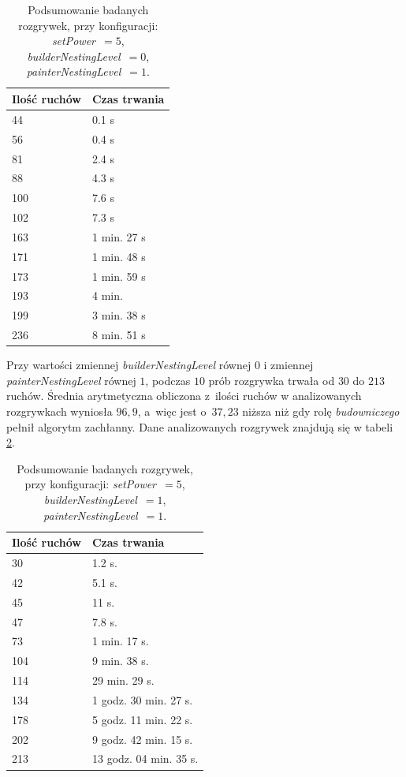 \documentclass[document]{xmgr}
\begin{document}
\begin{table}[tbh]
    \centering
    	\caption{Podsumowanie badanych rozgrywek, przy konfiguracji: \emph{setPower}~$=5$, \emph{builderNestingLevel}~$=0$, \emph{painterNestingLevel}~$=1$.}
	\begin{tabular}{|p{}|p{}|} \hline
	Ilość ruchów & Czas trwania \\ \hline
	44 & 0.1 s\\ \hline
	56 & 0.4 s\\ \hline
	81 & 2.4 s\\ \hline
	88 & 4.3 s\\ \hline
	100 & 7.6 s\\ \hline
	102 & 7.3 s\\ \hline
	163 & 1 min. 27 s \\ \hline
	171 & 1 min. 48 s \\ \hline
	173 & 1 min. 59 s \\ \hline
	193 & 4 min. \\ \hline
	199 & 3 min. 38 s\\ \hline
	236 & 8 min. 51 s \\ \hline
	\end{tabular}
	\label{fig:builder0Painter1Table}
\end{table}

Przy wartości zmiennej \emph{builderNestingLevel} równej $0$ i zmiennej \emph{painterNestingLevel} równej $1$, podczas $10$ prób rozgrywka trwała od $30$ do $213$ ruchów. Średnia arytmetyczna obliczona z~ilości ruchów w analizowanych rozgrywkach wyniosła $96,9$, a~więc jest o~$37,23$ niższa niż gdy rolę \emph{budowniczego} pełnił algorytm zachłanny. Dane analizowanych rozgrywek znajdują się w tabeli \ref{fig:builder1Painter1Table}.

\begin{table}[tbh]
    \centering
    	\caption{Podsumowanie badanych rozgrywek, przy konfiguracji: \emph{setPower}~$=5$, \emph{builderNestingLevel}~$=1$, \emph{painterNestingLevel}~$=1$.}
	\begin{tabular}{|p{}|p{}|} \hline
	Ilość ruchów & Czas trwania \\ \hline
	30 & 1.2 s. \\ \hline	
	42 & 5.1 s. \\ \hline
	45 & 11 s. \\ \hline	
	47 & 7.8 s. \\ \hline
	73 & 1 min. 17 s. \\ \hline
	104 & 9 min. 38 s. \\ \hline
	114 & 29 min. 29 s. \\ \hline
	134 & 1 godz. 30 min. 27 s.  \\ \hline
	178 & 5 godz. 11 min. 22 s. \\ \hline
	202 & 9 godz. 42 min. 15 s. \\ \hline
	213 & 13 godz. 04 min. 35 s. \\ \hline
	\end{tabular}
	\label{fig:builder1Painter1Table}
\end{table}
\end{document}
